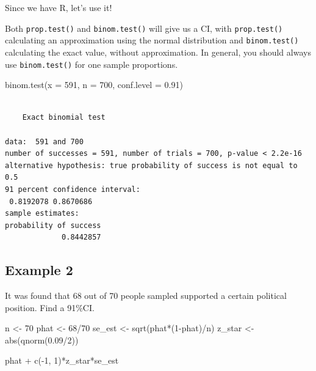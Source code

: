 \documentclass[
  letterpaper,
  DIV=11,
  numbers=noendperiod,
  oneside]{scrreprt}
\newenvironment{Shaded}{\begin{snugshade}}{\end{snugshade}}
\newcommand{\AttributeTok}[1]{\textcolor[rgb]{0.40,0.45,0.13}{#1}}
\newcommand{\DecValTok}[1]{\textcolor[rgb]{0.68,0.00,0.00}{#1}}
\newcommand{\FloatTok}[1]{\textcolor[rgb]{0.68,0.00,0.00}{#1}}
\newcommand{\FunctionTok}[1]{\textcolor[rgb]{0.28,0.35,0.67}{#1}}
\newcommand{\NormalTok}[1]{\textcolor[rgb]{0.00,0.23,0.31}{#1}}
\newcommand{\OtherTok}[1]{\textcolor[rgb]{0.00,0.23,0.31}{#1}}
\newcommand{\SpecialCharTok}[1]{\textcolor[rgb]{0.37,0.37,0.37}{#1}}
\begin{document}
Since we have R, let's use it!

Both \texttt{prop.test()} and \texttt{binom.test()} will give us a CI,
with \texttt{prop.test()} calculating an approximation using the normal
distribution and \texttt{binom.test()} calculating the exact value,
without approximation. In general, you should always use
\texttt{binom.test()} for one sample proportions.

\begin{Shaded}
\begin{Highlighting}[]
\FunctionTok{binom.test}\NormalTok{(}\AttributeTok{x =} \DecValTok{591}\NormalTok{, }\AttributeTok{n =} \DecValTok{700}\NormalTok{, }\AttributeTok{conf.level =} \FloatTok{0.91}\NormalTok{)}
\end{Highlighting}
\end{Shaded}

\begin{verbatim}

    Exact binomial test

data:  591 and 700
number of successes = 591, number of trials = 700, p-value < 2.2e-16
alternative hypothesis: true probability of success is not equal to 0.5
91 percent confidence interval:
 0.8192078 0.8670686
sample estimates:
probability of success 
             0.8442857 
\end{verbatim}

\hypertarget{example-2-1}{%
\subsection{Example 2}\label{example-2-1}}

It was found that 68 out of 70 people sampled supported a certain
political position. Find a 91\%CI.\pause

\begin{Shaded}
\begin{Highlighting}[]
\NormalTok{n }\OtherTok{\textless{}{-}} \DecValTok{70}
\NormalTok{phat }\OtherTok{\textless{}{-}} \DecValTok{68}\SpecialCharTok{/}\DecValTok{70}
\NormalTok{se\_est }\OtherTok{\textless{}{-}} \FunctionTok{sqrt}\NormalTok{(phat}\SpecialCharTok{*}\NormalTok{(}\DecValTok{1}\SpecialCharTok{{-}}\NormalTok{phat)}\SpecialCharTok{/}\NormalTok{n)}
\NormalTok{z\_star }\OtherTok{\textless{}{-}} \FunctionTok{abs}\NormalTok{(}\FunctionTok{qnorm}\NormalTok{(}\FloatTok{0.09}\SpecialCharTok{/}\DecValTok{2}\NormalTok{))}

\NormalTok{phat }\SpecialCharTok{+} \FunctionTok{c}\NormalTok{(}\SpecialCharTok{{-}}\DecValTok{1}\NormalTok{, }\DecValTok{1}\NormalTok{)}\SpecialCharTok{*}\NormalTok{z\_star}\SpecialCharTok{*}\NormalTok{se\_est}
\end{Highlighting}
\end{Shaded}
\end{document}
